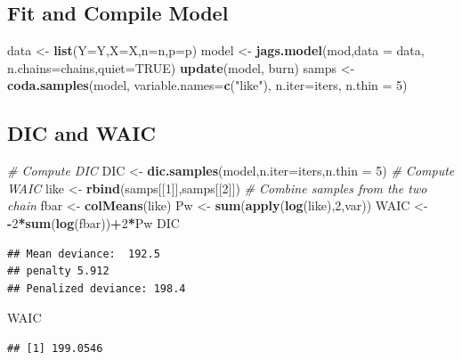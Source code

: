 \documentclass[
]{article}
\newenvironment{Shaded}{\begin{snugshade}}{\end{snugshade}}
\newcommand{\AttributeTok}[1]{\textcolor[rgb]{0.13,0.29,0.53}{#1}}
\newcommand{\CommentTok}[1]{\textcolor[rgb]{0.56,0.35,0.01}{\textit{#1}}}
\newcommand{\ConstantTok}[1]{\textcolor[rgb]{0.56,0.35,0.01}{#1}}
\newcommand{\DecValTok}[1]{\textcolor[rgb]{0.00,0.00,0.81}{#1}}
\newcommand{\FunctionTok}[1]{\textcolor[rgb]{0.13,0.29,0.53}{\textbf{#1}}}
\newcommand{\NormalTok}[1]{#1}
\newcommand{\OtherTok}[1]{\textcolor[rgb]{0.56,0.35,0.01}{#1}}
\newcommand{\SpecialCharTok}[1]{\textcolor[rgb]{0.81,0.36,0.00}{\textbf{#1}}}
\newcommand{\StringTok}[1]{\textcolor[rgb]{0.31,0.60,0.02}{#1}}
\begin{document}
\subsection{Fit and Compile Model}\label{fit-and-compile-model}

\begin{Shaded}
\begin{Highlighting}[]
\NormalTok{data }\OtherTok{\textless{}{-}} \FunctionTok{list}\NormalTok{(}\AttributeTok{Y=}\NormalTok{Y,}\AttributeTok{X=}\NormalTok{X,}\AttributeTok{n=}\NormalTok{n,}\AttributeTok{p=}\NormalTok{p)}
\NormalTok{model }\OtherTok{\textless{}{-}} \FunctionTok{jags.model}\NormalTok{(mod,}\AttributeTok{data =}\NormalTok{ data, }\AttributeTok{n.chains=}\NormalTok{chains,}\AttributeTok{quiet=}\ConstantTok{TRUE}\NormalTok{)}
\FunctionTok{update}\NormalTok{(model, burn)}
\NormalTok{samps }\OtherTok{\textless{}{-}} \FunctionTok{coda.samples}\NormalTok{(model, }\AttributeTok{variable.names=}\FunctionTok{c}\NormalTok{(}\StringTok{"like"}\NormalTok{),}
\AttributeTok{n.iter=}\NormalTok{iters, }\AttributeTok{n.thin =} \DecValTok{5}\NormalTok{)}
\end{Highlighting}
\end{Shaded}

\subsection{DIC and WAIC}\label{dic-and-waic}

\begin{Shaded}
\begin{Highlighting}[]
\CommentTok{\# Compute DIC}
\NormalTok{DIC }\OtherTok{\textless{}{-}} \FunctionTok{dic.samples}\NormalTok{(model,}\AttributeTok{n.iter=}\NormalTok{iters,}\AttributeTok{n.thin =} \DecValTok{5}\NormalTok{)}
\CommentTok{\# Compute WAIC}
\NormalTok{like }\OtherTok{\textless{}{-}} \FunctionTok{rbind}\NormalTok{(samps[[}\DecValTok{1}\NormalTok{]],samps[[}\DecValTok{2}\NormalTok{]]) }\CommentTok{\# Combine samples from the two chain}
\NormalTok{fbar }\OtherTok{\textless{}{-}} \FunctionTok{colMeans}\NormalTok{(like)}
\NormalTok{Pw }\OtherTok{\textless{}{-}} \FunctionTok{sum}\NormalTok{(}\FunctionTok{apply}\NormalTok{(}\FunctionTok{log}\NormalTok{(like),}\DecValTok{2}\NormalTok{,var))}
\NormalTok{WAIC }\OtherTok{\textless{}{-}} \SpecialCharTok{{-}}\DecValTok{2}\SpecialCharTok{*}\FunctionTok{sum}\NormalTok{(}\FunctionTok{log}\NormalTok{(fbar))}\SpecialCharTok{+}\DecValTok{2}\SpecialCharTok{*}\NormalTok{Pw}
\NormalTok{DIC}
\end{Highlighting}
\end{Shaded}

\begin{verbatim}
## Mean deviance:  192.5 
## penalty 5.912 
## Penalized deviance: 198.4
\end{verbatim}

\begin{Shaded}
\begin{Highlighting}[]
\NormalTok{WAIC}
\end{Highlighting}
\end{Shaded}

\begin{verbatim}
## [1] 199.0546
\end{verbatim}
\end{document}
